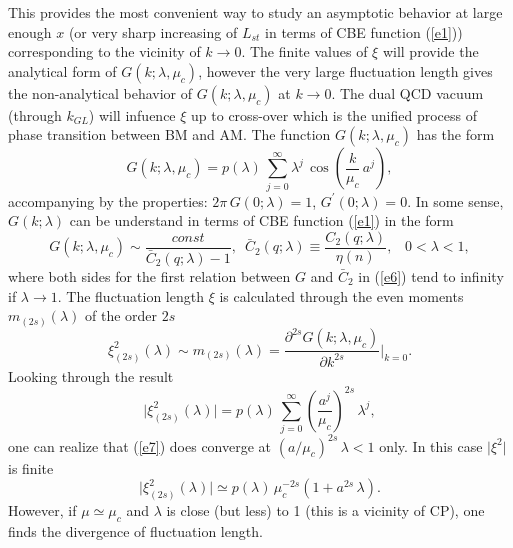 \documentclass[WPCF,manyauthors]{wpcfTemplate}
\begin{document}
This provides the most convenient way to study an asymptotic behavior at large enough $x$ (or very sharp increasing of $L_{st}$ in terms of CBE function (\ref{e1})) corresponding to the vicinity of $k\rightarrow 0$. The finite values of $\xi$ will provide the analytical form of $G(k;\lambda,\mu_{c})$, however the very large fluctuation length gives the non-analytical behavior of $G(k;\lambda,\mu_{c})$ at $k\rightarrow 0$. The dual QCD vacuum (through $k_{GL}$) will infuence $\xi$ up to cross-over 
which is the unified process of phase transition between BM and AM. The function $G(k;\lambda,\mu_{c})$ has the form
\begin{equation}
\label{e5}
G(k;\lambda,\mu_{c}) = p(\lambda)\,\sum_{j=0}^{\infty} \lambda^{j}\,\cos\left ( \frac{k}{\mu_{c}}\,a^{j}\right ),
\end{equation}
accompanying by the properties: $2\pi\,G(0;\lambda) =1$, $G^{\prime} (0;\lambda) =0$. 
In some sense,  $G(k;\lambda)$ can be understand in terms of CBE function (\ref{e1}) in the form 
\begin{equation}
\label{e6}
G(k;\lambda,\mu_{c}) \sim \frac {const}{\bar C_{2}(q;\lambda) -1}, \,\,\, \bar C_{2}(q;\lambda) \equiv \frac{C_{2}(q;\lambda)}{\eta (n)},\,\, \,\,\,0 < \lambda < 1,
\end{equation}
where both sides for the first relation between $G$ and $\bar C_{2}$ in  (\ref{e6}) tend to infinity if $\lambda\rightarrow 1$. The fluctuation length $\xi$ is calculated through the even moments $m_{(2s)} (\lambda)$ of the order $2s$  
$$\xi^{2}_{(2s)} (\lambda) \sim m_{(2s)}(\lambda) = \frac{ \partial^{2s} G(k;\lambda,\mu_{c})}{\partial k^{2s}}\vert _{k=0}.$$
Looking through the result
\begin{equation}
\label{e7}
\vert \xi^{2}_{(2s)} (\lambda)\vert = p(\lambda)\,\sum_{j=0}^{\infty}{\left (\frac{a^{j}}{\mu_{c}}\right )}^{2s}\,\lambda ^{j},
\end{equation}
 one can realize that (\ref{e7}) does converge at  $(a/\mu_{c})^{2s}\,\lambda < 1$ only. In this case $\vert\xi^{2}\vert$ is finite
$$ \vert \xi^{2}_{(2s)} (\lambda)\vert \simeq p(\lambda)\,\mu^{-2s}_{c}\left ( 1+ a^{2s}\,\lambda\right ). $$
However, if $\mu \simeq \mu_{c}$ and $\lambda$ is close (but less) to 1 (this is a vicinity of CP), one finds the divergence of fluctuation length.
\end{document}
